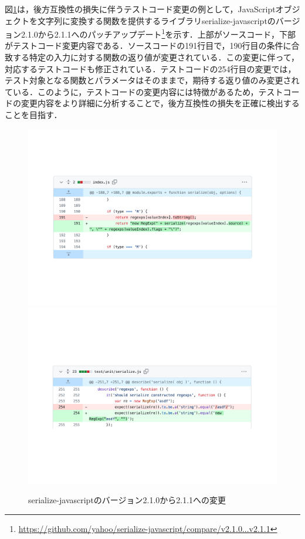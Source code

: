\documentclass[11pt,dvipdfmx]{jreport}
\begin{document}
図\ref{fig:motivation}は，後方互換性の損失に伴うテストコード変更の例として，JavaScriptオブジェクトを文字列に変換する関数を提供するライブラリserialize-javascriptのバージョン2.1.0から2.1.1へのパッチアップデート\footnote{\url{https://github.com/yahoo/serialize-javascript/compare/v2.1.0...v2.1.1}}を示す．上部がソースコード，下部がテストコード変更内容である．ソースコードの191行目で，190行目の条件に合致する特定の入力に対する関数の返り値が変更されている．この変更に伴って，対応するテストコードも修正されている．テストコードの254行目の変更では，テスト対象となる関数とパラメータはそのままで，期待する返り値のみ変更されている．このように，テストコードの変更内容には特徴があるため，テストコードの変更内容をより詳細に分析することで，後方互換性の損失を正確に検出することを目指す．

\begin{figure}[t]
  \label{fig:motivation}
  \centering
  \includegraphics[width=1.0\linewidth]{fig/rq1/serialize-javascript/index.pdf}
  \includegraphics[width=1.0\linewidth]{fig/rq1/serialize-javascript/index.test.pdf}
  \caption{serialize-javascriptのバージョン2.1.0から2.1.1への変更}
\end{figure}
\end{document}
